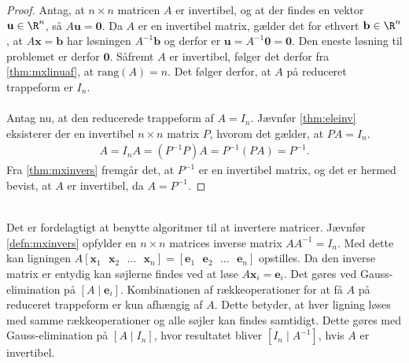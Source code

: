 \begin{proof}
Antag, at $n\times n$ matricen $A$ er invertibel, og at der findes en vektor $\textbf{u} \in \R^n$, så $A\textbf{u}=\textbf{0}$. 
Da $A$ er en invertibel matrix, gælder det for ethvert $\mathbf{b} \in \R^n$, at $A\textbf{x}=\mathbf{b}$ har løsningen $A^{-1}\mathbf{b}$ og derfor er $\textbf{u}=A^{-1}\textbf{0}=\textbf{0}$. 
Den eneste løsning til problemet er derfor $\textbf{0}$. 
Såfremt $A$ er invertibel, følger det derfor fra \ref{thm:mxlinuaf}, at $\text{rang}(A)=n$.
Det følger derfor, at $A$ på reduceret trappeform er $I_n$.
\\\\
Antag nu, at den reducerede trappeform af $A=I_n$. 
Jævnfør \ref{thm:eleinv} eksisterer der en invertibel $n \times n$ matrix $P$, hvorom det gælder, at $PA=I_n$. 
%
\begin{align*}
A=I_nA=(P^{-1}P)A=P^{-1}(PA)=P^{-1}.
\end{align*}
%
Fra \ref{thm:mxinvers} fremgår det, at $P^{-1}$ er en invertibel matrix, og det er hermed bevist, at $A$ er invertibel, da $A=P^{-1}$.
\end{proof}
\\
Det er fordelagtigt at benytte algoritmer til at invertere matricer.
Jævnfør \ref{defn:mxinvers} opfylder en $n \times n$ matrices inverse matrix $AA^{-1}=I_n$.
Med dette kan ligningen $A[\textbf{x}_1\text{  }\textbf{x}_2\text{  }\ldots\text{  }\textbf{x}_n ] = [\textbf{e}_1\text{  }\textbf{e}_2\text{  }\ldots\text{  }\textbf{e}_n]$ opstilles.
Da den inverse matrix er entydig kan søjlerne findes ved at løse $A\textbf{x}_i = \textbf{e}_i$.
Det gøres ved Gauss-elimination på $[A \mid \textbf{e}_i]$.
Kombinationen af rækkeoperationer for at få $A$ på reduceret trappeform er kun afhængig af $A$.
Dette betyder, at hver ligning løses med samme rækkeoperationer og alle søjler kan findes samtidigt.
Dette gøres med Gauss-elimination på $[A \mid I_n]$, hvor resultatet bliver $[I_n \mid A^{-1}]$, hvis $A$ er invertibel.\\
%
%
